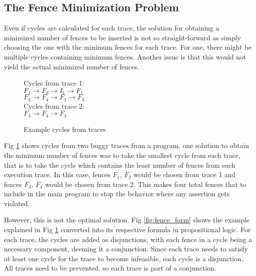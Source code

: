 \subsection{The Fence Minimization Problem} \label{sec:fence-min}
\par
Even if cycles are calculated for each trace, the solution for obtaining 
a minimized number of fences to be inserted is not so straight-forward 
as simply choosing the one with the minimum fences for each trace. 
For one, there might be multiple cycles containing minimum fences. 
Another issue is that this would not yield the actual minimized 
number of fences. 

\begin{figure}
\begin{center}
	Cycles from trace 1:\\
	\textit{$F_1 \rightarrow F_2 \rightarrow I_1 \rightarrow F_1$}\\
	\textit{$F_3 \rightarrow F_4 \rightarrow F_1 \rightarrow F_3$}\\
	Cycles from trace 2:\\
	\textit{$F_3 \rightarrow F_4 \rightarrow F_3$}
	\caption{Example cycles from traces}
	\label{fig:fence_min}
\end{center}
\end{figure}

Fig \ref{fig:fence_min} shows cycles from two buggy traces from 
a program. 
one solution to obtain the minimum number of fences was 
to take the smallest cycle from each trace, that is to take the 
cycle which contains the least number of fences from each execution 
trace. In this case, fences \textit{$F_1$}, \textit{$F_2$} 
would be chosen from trace 1 and fences \textit{$F_3$}, \textit{$F_4$} 
would be chosen from trace 2. This makes four total fences that 
to include in the main program to stop the behavior where 
any assertion gets violated.

\par
However, this is not the optimal solution. Fig \ref{fig:fence_form} 
shows the example explained in Fig \ref{fig:fence_min} converted 
into its respective formula in propositional logic. For each trace, 
the cycles are added as disjunctions, with each fence in a cycle 
being a necessary component, deeming it a conjunction. Since each 
trace needs to satisfy at least one cycle for the trace to become 
infeasible, each cycle is a disjunction. All traces need to be 
prevented, so each trace is part of a conjunction.

